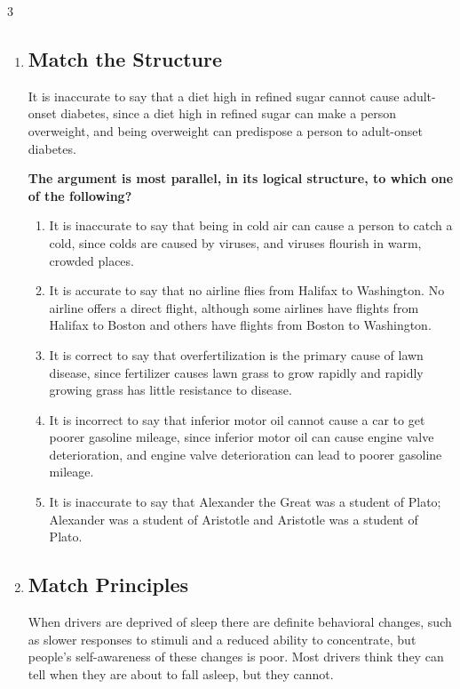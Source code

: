 \documentclass[9pt]{article}
\begin{document}
\begin{multicols}{3}
\begin{enumerate}
\item
\subsection*{Match the Structure}

\noindent
It is inaccurate to say that a diet high in refined sugar cannot cause adult-onset diabetes, since a diet high in refined sugar can make a person overweight, and being overweight can predispose a person to adult-onset diabetes.

 

\noindent
\textbf{The argument is most parallel, in its logical structure, to which one of the following?}

\begin{enumerate}[label=(\alph*)]
    \item It is inaccurate to say that being in cold air can cause a person to catch a cold, since colds are caused by viruses, and viruses flourish in warm, crowded places.
    \item It is accurate to say that no airline flies from Halifax to Washington. No airline offers a direct flight, although some airlines have flights from Halifax to Boston and others have flights from Boston to Washington.
    \item It is correct to say that overfertilization is the primary cause of lawn disease, since fertilizer causes lawn grass to grow rapidly and rapidly growing grass has little resistance to disease.
    \item It is incorrect to say that inferior motor oil cannot cause a car to get poorer gasoline mileage, since inferior motor oil can cause engine valve deterioration, and engine valve deterioration can lead to poorer gasoline mileage.
    \item It is inaccurate to say that Alexander the Great was a student of Plato; Alexander was a student of Aristotle and Aristotle was a student of Plato.
\end{enumerate}

\item
\subsection*{Match Principles}

\noindent
When drivers are deprived of sleep there are definite behavioral changes, such as slower responses to stimuli and a reduced ability to concentrate, but people's self-awareness of these changes is poor. Most drivers think they can tell when they are about to fall asleep, but they cannot.


\end{enumerate}
\end{multicols}
\end{document}
